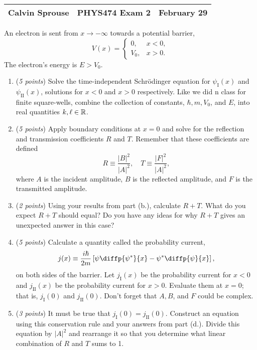 \documentclass[a4paper, 12pt]{config/homework}
\begin{document}
\noindent
\begin{tabularx}{\textwidth}{>{\centering\arraybackslash}X>{\centering\arraybackslash}X>{\centering\arraybackslash}X}
Calvin Sprouse & PHYS474 Exam 2 & 2024 February 29\\
\midrule
\end{tabularx}

\vspace{\baselineskip}\noindent
An electron is sent from \(x\to-\infty \) towards a potential barrier,
\[V(x) = \begin{cases}
0, & x < 0, \\ V_0, & x > 0.
\end{cases}\]
The electron's energy is \(E>V_0\).
\begin{enumerate}[label=(\alph*.)]
\item (\textit{5 points}) Solve the time-independent Schr{\"o}dinger equation for \(\psi_\text{I}(x)\) and \(\psi_\text{II}(x)\), solutions for \(x<0\) and \(x>0\) respectively. Like we did n class for finite square-wells, combine the collection of constants, \(\hbar,m,V_0\), and \(E\), into real quantities \(k,\ell\in\mathbb{R} \).



\item (\textit{5 points}) Apply boundary conditions at \(x=0\) and solve for the reflection and transmission coefficients \(R\) and \(T\). Remember that these coefficients are defined
\[R \equiv \frac{|B|^2}{|A|^2}, \quad T\equiv\frac{|F|^2}{|A|^2},\]
where \(A\) is the incident amplitude, \(B\) is the reflected amplitude, and \(F\) is the transmitted amplitude.



\item (\textit{2 points}) Using your results from part (b.), calculate \(R+T\). What do you expect \(R+T\) should equal? Do you have any ideas for why \(R+T\) gives an unexpected answer in this case?



\item (\textit{5 points}) Calculate a quantity called the probability current,
\[j(x) \equiv \frac{i\hbar}{2m}\left[\psi\diffp{\psi^*}{x} - \psi^*\diffp{\psi}{x}\right],\]
on both sides of the barrier. Let \(j_\text{I}(x)\) be the probability current for \(x<0\) and \(j_\text{II}(x)\) be the probability current for \(x>0\). Evaluate them at \(x=0\); that is, \(j_\text{I}(0)\) and \(j_\text{II}(0)\). Don't forget that \(A,B\), and \(F\) could be complex.



\item (\textit{3 points}) It must be true that \(j_\text{I}(0)=j_\text{II}(0)\). Construct an equation using this conservation rule and your answers from part (d.). Divide this equation by \(|A|^2\) and rearrange it so that you determine what linear combination of \(R\) and \(T\) sums to 1.



\end{enumerate}
\end{document}
